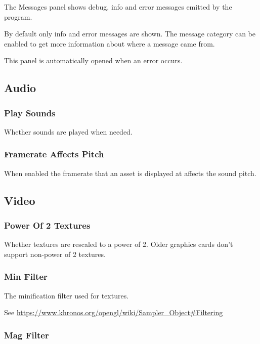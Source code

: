 \documentclass[10pt, a4paper, titlepage, oneside]{article}
\begin{document}
The Messages panel shows debug, info and error messages emitted by the program.

By default only info and error messages are shown. The message category can be enabled to get more information about where a message came from.

This panel is automatically opened when an error occurs.

\newpage

\subsection{Audio}

\subsubsection{Play Sounds}

Whether sounds are played when needed.

\subsubsection{Framerate Affects Pitch}

When enabled the framerate that an asset is displayed at affects the sound pitch.

\subsection{Video}

\subsubsection{Power Of 2 Textures}

Whether textures are rescaled to a power of 2. Older graphics cards don't support non-power of 2 textures.

\subsubsection{Min Filter}

The minification filter used for textures.

\sloppy
See \url{https://www.khronos.org/opengl/wiki/Sampler_Object#Filtering}

\subsubsection{Mag Filter}
\end{document}
